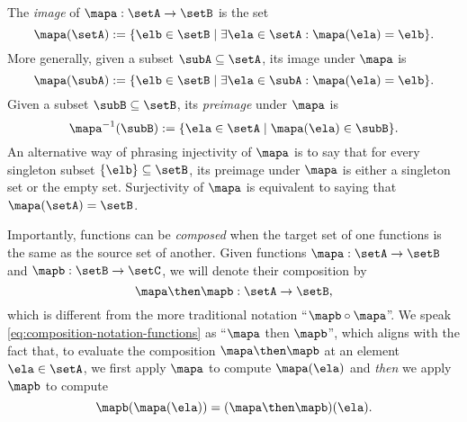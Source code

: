 The \emph{image} of $\mapa: \setA \to \setB$ is the set
\begin{equation}
\mapa(\setA) := \{ \elb \in \setB \mid \exists \ela \in \setA : \mapa(\ela) = \elb \}. 
\end{equation}
More generally, given a subset $\subA \subseteq \setA$, its image under $\mapa$ is
\begin{equation}
\mapa(\subA) := \{ \elb \in \setB \mid \exists \ela \in \subA : \mapa(\ela) = \elb \}. 
\end{equation}
Given a subset $\subB \subseteq \setB$, its \emph{preimage} under $\mapa$ is
\begin{equation}
\mapa^{-1}(\subB) :=\{ \ela \in \setA \mid  \mapa(\ela) \in \subB \}. 
\end{equation}
An alternative way of phrasing injectivity of $\mapa$ is to say that for every singleton subset $\{ \elb \} \subseteq \setB$, its preimage under $\mapa$ is either a singleton set or the empty set. Surjectivity of $\mapa$ is equivalent to saying that $\mapa(\setA) = \setB$. 

Importantly, functions can be \emph{composed} when the target set of one functions is the same as the source set of another. Given functions $\mapa: \setA \to \setB$ and $\mapb : \setB \to \setC$, we will denote their composition by
\begin{equation}\label{eq:composition-notation-functions}
\mapa \then \mapb : \setA \to \setB,
\end{equation}
which is different from the more traditional notation ``$\mapb \circ \mapa$''. We speak \cref{eq:composition-notation-functions} as ``$\mapa$ then $\mapb$'', which aligns with the fact that, to evaluate the composition $\mapa \then \mapb$ at an element $\ela \in \setA$, we first apply $\mapa$ to compute $\mapa(\ela)$ and \emph{then} we apply $\mapb$ to compute
$$\mapb(\mapa(\ela))=(\mapa \then \mapb)(\ela).$$ 


\

\













\clearpage
